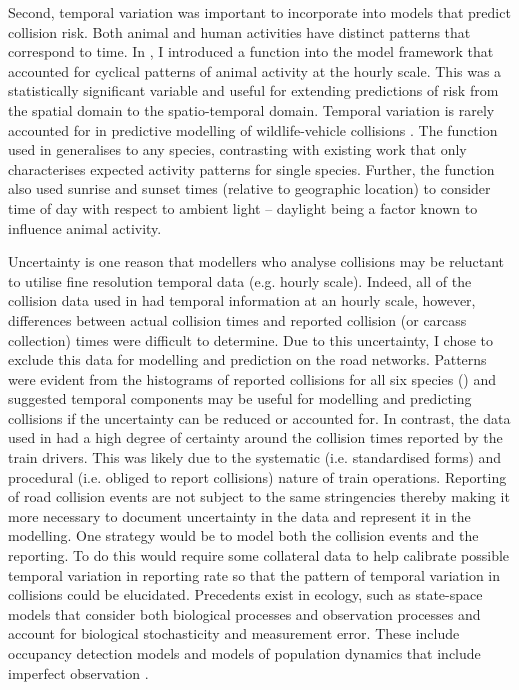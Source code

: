 Second, temporal variation was important to incorporate into models that predict collision risk. Both animal and human activities have distinct patterns that correspond to time. In , I introduced a function into the model framework that accounted for cyclical patterns of animal activity at the hourly scale. This was a statistically significant variable and useful for extending predictions of risk from the spatial domain to the spatio-temporal domain. Temporal variation is rarely accounted for in predictive modelling of wildlife-vehicle collisions \citep[but see][]{beau10,gund98,neum12}. The function used in  generalises to any species, contrasting with existing work that only characterises expected activity patterns for single species. Further, the function also used sunrise and sunset times (relative to geographic location) to consider time of day with respect to ambient light -- daylight being a factor known to influence animal activity.

Uncertainty is one reason that modellers who analyse collisions may be reluctant to utilise fine resolution temporal data (e.g. hourly scale). Indeed, all of the collision data used in  had temporal information at an hourly scale, however, differences between actual collision times and reported collision (or carcass collection) times were difficult to determine. Due to this uncertainty, I chose to exclude this data for modelling and prediction on the road networks. Patterns were evident from the histograms of reported collisions for all six species () and suggested temporal components may be useful for modelling and predicting collisions if the uncertainty can be reduced or accounted for. In contrast, the data used in  had a high degree of certainty around the collision times reported by the train drivers. This was likely due to the systematic (i.e. standardised forms) and procedural (i.e. obliged to report collisions) nature of train operations. Reporting of road collision events are not subject to the same stringencies thereby making it more necessary to document uncertainty in the data and represent it in the modelling. One strategy would be to model both the collision events and the reporting. To do this would require some collateral data to help calibrate possible temporal variation in reporting rate so that the pattern of temporal variation in collisions could be elucidated. Precedents exist in ecology, such as state-space models that consider both biological processes and observation processes and account for biological stochasticity and measurement error. These include occupancy detection models \citep[e.g. ][]{mack02} and models of population dynamics that include imperfect observation \citep[e.g. ][]{mack09}.

